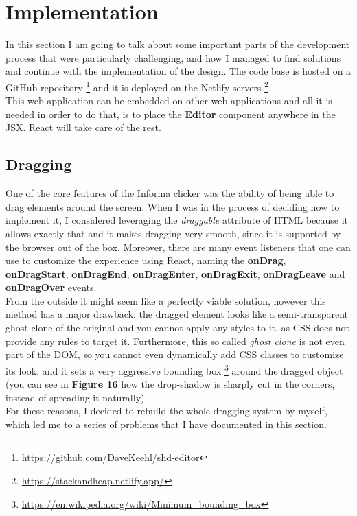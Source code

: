 \documentclass[]{usiinfbachelorproject}
\begin{document}
\vspace{\fill}

\pagebreak

\section{Implementation} \label{implementation}

In this section I am going to talk about some important parts of the development process that were particularly challenging, and how I managed to find solutions and continue with the implementation of the design. The code base is hosted on a GitHub repository \footnote{\url{https://github.com/DaveKeehl/shd-editor}} and it is deployed on the Netlify servers \footnote{\url{https://stackandheap.netlify.app/}}.\\
\noindent This web application can be embedded on other web applications and all it is needed in order to do that, is to place the \textbf{Editor} component anywhere in the JSX. React will take care of the rest.

\subsection{Dragging}

One of the core features of the Informa clicker was the ability of being able to drag elements around the screen. When I was in the process of deciding how to implement it, I considered leveraging the \emph{draggable} attribute of HTML because it allows exactly that and it makes dragging very smooth, since it is supported by the browser out of the box. Moreover, there are many event listeners that one can use to customize the experience using React, naming the \textbf{onDrag}, \textbf{onDragStart}, \textbf{onDragEnd}, \textbf{onDragEnter}, \textbf{onDragExit}, \textbf{onDragLeave} and \textbf{onDragOver} events.\\
From the outside it might seem like a perfectly viable solution, however this method has a major drawback: the dragged element looks like a semi-transparent ghost clone of the original and you cannot apply any styles to it, as CSS does not provide any rules to target it. Furthermore, this so called \emph{ghost clone} is not even part of the DOM, so you cannot even dynamically add CSS classes to customize its look, and it sets a very aggressive bounding box \footnote{\url{https://en.wikipedia.org/wiki/Minimum_bounding_box}} around the dragged object (you can see in \textbf{Figure 16} how the drop-shadow is sharply cut in the corners, instead of spreading it naturally).\\
For these reasons, I decided to rebuild the whole dragging system by myself, which led me to a series of problems that I have documented in this section.
 
\end{document}
